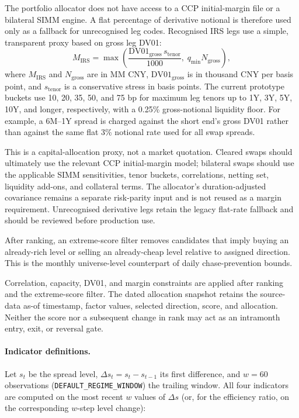 The portfolio allocator does not have access to a CCP initial-margin file or a
bilateral SIMM engine. A flat percentage of derivative notional is therefore
used only as a fallback for unrecognised leg codes. Recognised IRS legs use a
simple, transparent proxy based on gross leg DV01:
\begin{equation}
 M_{\mathrm{IRS}} = \max\left(
 \frac{\mathrm{DV01}_{\mathrm{gross}}\,s_{\mathrm{tenor}}}{1000},
 \; q_{\min}N_{\mathrm{gross}}
 \right),
\end{equation}
where $M_{\mathrm{IRS}}$ and $N_{\mathrm{gross}}$ are in MM CNY,
$\mathrm{DV01}_{\mathrm{gross}}$ is in thousand CNY per basis point, and
$s_{\mathrm{tenor}}$ is a conservative stress in basis points. The current
prototype buckets use 10, 20, 35, 50, and 75 bp for maximum leg tenors up to
1Y, 3Y, 5Y, 10Y, and longer, respectively, with a 0.25\% gross-notional
liquidity floor. For example, a 6M--1Y spread is charged against the short
end's gross DV01 rather than against the same flat 3\% notional rate used for
all swap spreads.

This is a capital-allocation proxy, not a market quotation. Cleared swaps
should ultimately use the relevant CCP initial-margin model; bilateral swaps
should use the applicable SIMM sensitivities, tenor buckets, correlations,
netting set, liquidity add-ons, and collateral terms. The allocator's
duration-adjusted covariance remains a separate risk-parity input and is not
reused as a margin requirement. Unrecognised derivative legs retain the
legacy flat-rate fallback and should be reviewed before production use.

After ranking, an extreme-score filter removes candidates that imply buying an
already-rich level or selling an already-cheap level relative to assigned direction.
This is the monthly universe-level counterpart of daily chase-prevention bounds.

Correlation, capacity, DV01, and margin constraints are applied after ranking and
the extreme-score filter. The dated allocation snapshot retains the source-data
as-of timestamp, factor values, selected direction, score, and allocation. Neither
the score nor a subsequent change in rank may act as an intramonth entry, exit, or
reversal gate.

\paragraph{Indicator definitions.} Let $s_t$ be the spread level, $\Delta s_t = s_t -
s_{t-1}$ its first difference, and $w=60$ observations (\texttt{DEFAULT\_REGIME\_WINDOW})
the trailing window. All four indicators are computed on the most recent $w$ values of
$\Delta s$ (or, for the efficiency ratio, on the corresponding $w$-step level change):

